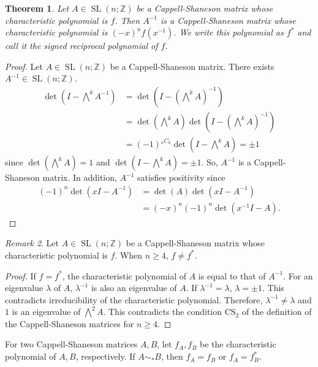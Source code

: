 \documentclass[12pt]{amsart}
\theoremstyle{plain}
\newtheorem{theorem}{Theorem}[section]
\theoremstyle{definition}
\theoremstyle{remark}
\newtheorem{remark}[theorem]{Remark}
\renewcommand{\(}{\big(}
\renewcommand{\)}{\big)}
\theoremstyle{plain}
\theoremstyle{definition}
\begin{document}
\begin{theorem}\label{theorem:csmulinverse}
Let $A \in \operatorname{SL}(n;\mathbb{Z})$ be a Cappell-Shaneson matrix whose characteristic polynomial is $f$. Then $A^{-1}$ is a Cappell-Shaneson matrix whose characteristic polynomial is $(-x)^nf(x^{-1})$. We write this polynomial as $f^*$ and call it the \textit{signed reciprocal polynomial} of $f$.
\end{theorem}
\begin{proof}
Let $A \in \operatorname{SL}(n;\mathbb{Z})$ be a Cappell-Shaneson matrix. There exists $A^{-1} \in \operatorname{SL}(n;\mathbb{Z})$. 
\begin{align*}
    \det(I-\bigwedge^k A^{-1})&=\det(I-(\bigwedge^k A)^{-1}) \\
                            &= \det(\bigwedge^k A)\det(I-(\bigwedge^k A)^{-1})\\
                            &=(-1)^{{}_{n} C_k}\det(I-\bigwedge^k A)=\pm 1
\end{align*}
since $\det(\bigwedge^k A)=1$ and $\det(I-\bigwedge^k A) = \pm 1$.
So, $A^{-1}$ is a Cappell-Shaneson matrix. In addition, $A^{-1}$ satisfies positivity since 
\begin{align*}
    (-1)^n\det(xI-A^{-1})&= \det(A)\det(xI-A^{-1})\\
                   &=(-x)^{n}(-1)^n\det(x^{-1}I-A).
\end{align*}
\end{proof}

\begin{remark}
    Let $A \in \operatorname{SL}(n;\mathbb{Z})$ be a Cappell-Shaneson matrix whose characteristic polynomial is $f$. When $n \ge 4$, $f \ne f^*$.
\end{remark}
\begin{proof}
    If $f = f^*$, the characteristic polynomial of $A$ is equal to that of $A^{-1}$. For an eigenvalue $\lambda$ of $A$, $\lambda^{-1}$ is also an eigenvalue of $A$. If $\lambda^{-1}=\lambda$, $\lambda=\pm 1$. This contradicts irreducibility of the characteristic polynomial. Therefore, $\lambda^{-1} \ne \lambda$ and $1$ is an eigenvalue of $\bigwedge^2 A$. This contradicts the condition $\mathrm{CS}_2$ of the definition of the Cappell-Shaneson matrices for $n \ge 4$.
\end{proof}


For two Cappell-Shaneson matrices $A, B$, let $f_A,f_B$ be the characteristic polynomial of $A,B$, respectively. If $A \sim_* B$, then $f_A = f_B$ or $f_A=f_B^*$. 
\end{document}
